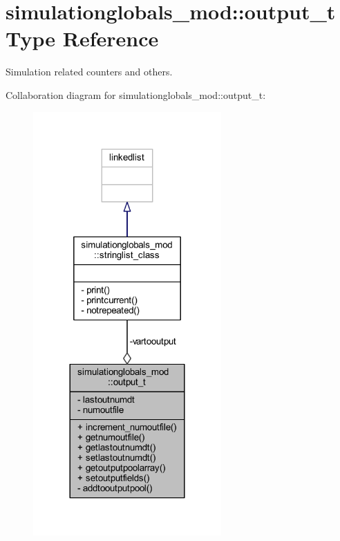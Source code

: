\hypertarget{structsimulationglobals__mod_1_1output__t}{}\section{simulationglobals\+\_\+mod\+:\+:output\+\_\+t Type Reference}
\label{structsimulationglobals__mod_1_1output__t}


Simulation related counters and others.  




Collaboration diagram for simulationglobals\+\_\+mod\+:\+:output\+\_\+t\+:\nopagebreak
\begin{figure}[H]
\begin{center}
\leavevmode
\includegraphics[width=204pt]{structsimulationglobals__mod_1_1output__t__coll__graph}
\end{center}
\end{figure}
